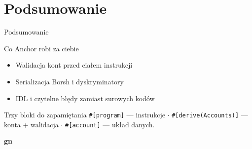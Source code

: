\section{Podsumowanie}

\begin{frame}{Podsumowanie}
  \addtocounter{beamerpauses}{-1}%
  \begin{block}{Co Anchor robi za ciebie}
    \begin{itemize}
      \item Walidacja kont przed ciałem instrukcji
      \item Serializacja Borsh i dyskryminatory
      \item IDL i czytelne błędy zamiast surowych kodów
    \end{itemize}
  \end{block}
  \vspace{0.3cm}
  \begin{block}{Trzy bloki do zapamiętania}
    \texttt{\#[program]} --- instrukcje $\cdot$
    \texttt{\#[derive(Accounts)]} --- konta + walidacja $\cdot$
    \texttt{\#[account]} --- układ danych.
  \end{block}
\end{frame}

\begin{frame}[plain]
  \begin{center}
    \vfill
    {\Huge\bfseries\color{stplwhite} gn}
    \vfill
  \end{center}
\end{frame}


